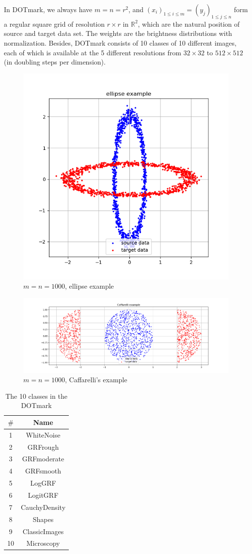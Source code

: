 \documentclass{article}
\begin{document}
\begin{large}
\begin{itemize}
  In DOTmark, we always have $m=n=r^{2}$, and $(x_i)_{1\leq i\leq m} = (y_j)_{1\leq j\leq n}$ form a regular square grid of resolution $r\times r$ in $\mathbb{R}^{2}$, which are the natural position of source and target data set. The weights are the brightness distributions with normalization. Besides, DOTmark consists of 10 classes of 10 different
  images, each of which is available at the 5 different
  resolutions from $32\times32$ to $512\times512$ (in doubling steps per dimension).
\end{itemize}
\begin{figure}[h]
  \centering
  \includegraphics[width=.5\textwidth]{ellip.png}
  \captionsetup{justification=centering}
  \caption{\label{fig:ellip}$m=n=1000$, ellipse example}
\end{figure}
\begin{figure}[h]
  \centering
  \includegraphics[width=.9\textwidth]{caffa.png}
  \captionsetup{justification=centering}
  \caption{\label{fig:caffa}$m=n=1000$, Caffarelli’s example}
\end{figure}
\begin{table}[H]
  \centering
  \begin{tabular}{|c|c|}
  \hline
  $\#$&Name\\
  \hline
  \hline
  1&WhiteNoise\\
  2&GRFrough\\
  3&GRFmoderate\\
  4&GRFsmooth\\
  5&LogGRF\\
  6&LogitGRF\\
  7&CauchyDensity\\
  8&Shapes\\
  9&ClassicImages\\
  10&Microscopy\\
  \hline
  \end{tabular}
  \caption{\label{tab:table1}The 10 classes in the DOTmark}
\end{table}


\end{large}
\end{document}
